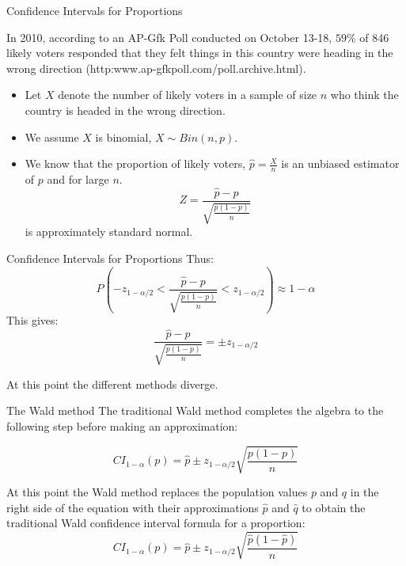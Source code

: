 \documentclass[
  ignorenonframetext,
]{beamer}
\begin{document}
\begin{frame}{Confidence Intervals for Proportions}
\label{confidence-intervals-for-proportions}
\begin{tcolorbox}
In 2010, according to an AP-Gfk Poll conducted on October 13-18, $59\%$ of 846 likely voters responded that they felt things in this country were heading in the wrong direction (http:www.ap-gfkpoll.com/poll.archive.html). 
\end{tcolorbox}

\begin{itemize}
\item
  Let \(X\) denote the number of likely voters in a sample of size \(n\)
  who think the country is headed in the wrong direction.
\item
  We assume \(X\) is binomial, \(X\sim Bin(n, p)\).
\item
  We know that the proportion of likely voters, \(\hat{p}=\frac{X}{n}\)
  is an unbiased estimator of \(p\) and for large \(n\).
  \[Z=\frac{\hat{p}-p}{\sqrt{\frac{p(1-p)}{n}}}\] is approximately
  standard normal.
\end{itemize}
\end{frame}

\begin{frame}{Confidence Intervals for Proportions}
\label{confidence-intervals-for-proportions-1}
Thus:
\[P\left(-z_{1-\alpha/2}<\frac{\hat{p}-p}{\sqrt{\frac{p(1-p)}{n}}}<z_{1-\alpha/2}\right)\approx 1-\alpha \]
This gives:
\[\frac{\hat{p}-p}{\sqrt{\frac{p(1-p)}{n}}}=\pm z_{1-\alpha/2}\]

At this point the different methods diverge.
\end{frame}

\begin{frame}{The Wald method}
\label{the-wald-method}
The traditional Wald method completes the algebra to the following step
before making an approximation:

\[CI_{1 - \alpha}(p) = \hat{p}\pm z_{1-\alpha/2}\sqrt{\frac{p(1-p)}{n}}\]

At this point the Wald method replaces the population values \(p\) and
\(q\) in the right side of the equation with their approximations
\(\hat{p}\) and \(\hat{q}\) to obtain the traditional Wald confidence
interval formula for a proportion:
\[CI_{1 - \alpha}(p)=\hat{p}\pm z_{1-\alpha/2}\sqrt{\frac{\hat{p}(1-\hat{p})}{n}}\]
\end{frame}
\end{document}
